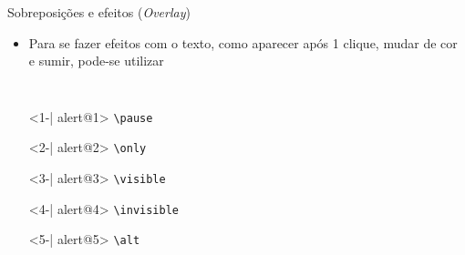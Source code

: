 \begin{frame}[fragile]{Sobreposições e efeitos (\textit{Overlay})}
    \begin{itemize}
    \item Para se fazer efeitos com o texto, como aparecer após 1 clique, mudar de cor e sumir, pode-se utilizar
    \end{itemize}

    \begin{columns}
        
        \begin{itemize}
        \item[]<1-| alert@1> \verb|\pause|
        \item[]<2-| alert@2> \verb|\only|
        \item[]<3-| alert@3> \verb|\visible|
        \item[]<4-| alert@4> \verb|\invisible|
        \item[]<5-| alert@5> \verb|\alt|
        \end{itemize}
        
           




\end{columns}
\end{frame}
